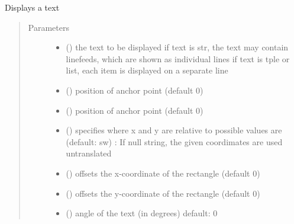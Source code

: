 \documentclass[letterpaper,10pt,english]{sphinxmanual}
\begin{document}
\begin{fulllineitems}
\label{\detokenize{Reference:salabim.AnimateText}}
Displays a text
\begin{quote}\begin{description}
\item[{Parameters}] \leavevmode\begin{itemize}
\item {} 
 (\sphinxstyleliteralemphasis{, }) \textendash{} the text to be displayed 
if text is str, the text may contain linefeeds, which are shown as individual lines
if text is tple or list, each item is displayed on a separate line

\item {} 
 () \textendash{} position of anchor point (default 0)

\item {} 
 () \textendash{} position of anchor point (default 0)

\item {} 
 () \textendash{} specifies where x and y are relative to 
possible values are (default: sw) : 
If null string, the given coordimates are used untranslated

\item {} 
 () \textendash{} offsets the x-coordinate of the rectangle (default 0)

\item {} 
 () \textendash{} offsets the y-coordinate of the rectangle (default 0)

\item {} 
 () \textendash{} angle of the text (in degrees) 
default: 0


\end{itemize}
\end{description}
\end{quote}
\end{fulllineitems}
\end{document}
